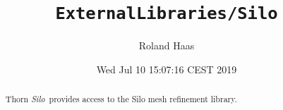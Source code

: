 \documentclass{article}
\begin{document}
\title{\tt ExternalLibraries/Silo}
\author{Roland Haas}
\date{ Wed Jul 10 15:07:16 CEST 2019 }

\maketitle


\ifx\ThisThorn\undefined
\newcommand{\ThisThorn}{{\it Silo}}
\else
\renewcommand{\ThisThorn}{{\it Silo}}
\fi

\begin{abstract}
Thorn \ThisThorn\ provides access to the Silo mesh refinement library.
\end{abstract}

\end{document}
